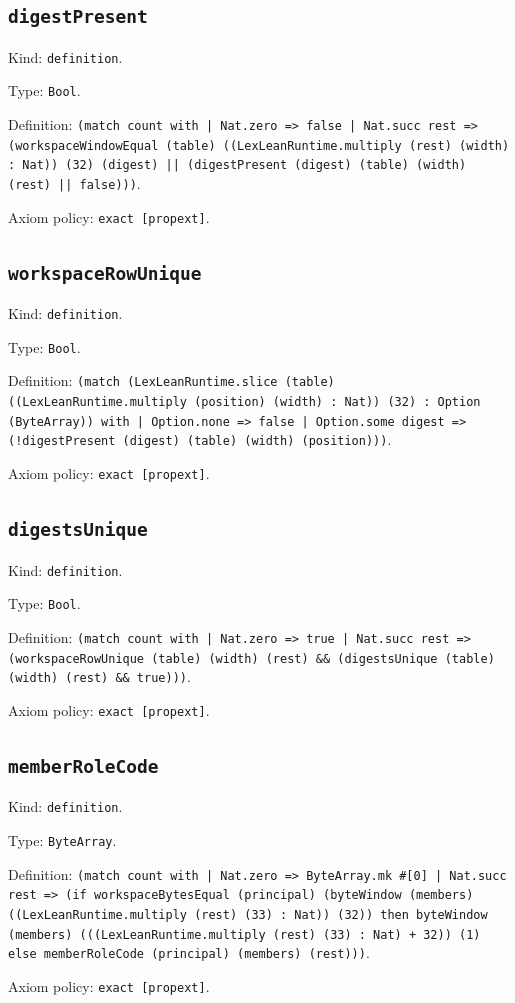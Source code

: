 \documentclass[11pt]{article}
\begin{document}
\subsection*{\texttt{digestPresent}}
\noindent Kind: \texttt{definition}.\par
\noindent Type: \texttt{Bool}.\par
\noindent Definition: \texttt{(match count with | Nat.zero => false | Nat.succ rest => (workspaceWindowEqual (table) ((LexLeanRuntime.multiply (rest) (width) : Nat)) (32) (digest) || (digestPresent (digest) (table) (width) (rest) || false)))}.\par
\noindent Axiom policy: \texttt{exact [propext]}.\par
\subsection*{\texttt{workspaceRowUnique}}
\noindent Kind: \texttt{definition}.\par
\noindent Type: \texttt{Bool}.\par
\noindent Definition: \texttt{(match (LexLeanRuntime.slice (table) ((LexLeanRuntime.multiply (position) (width) : Nat)) (32) : Option (ByteArray)) with | Option.none => false | Option.some digest => (!digestPresent (digest) (table) (width) (position)))}.\par
\noindent Axiom policy: \texttt{exact [propext]}.\par
\subsection*{\texttt{digestsUnique}}
\noindent Kind: \texttt{definition}.\par
\noindent Type: \texttt{Bool}.\par
\noindent Definition: \texttt{(match count with | Nat.zero => true | Nat.succ rest => (workspaceRowUnique (table) (width) (rest) \&\& (digestsUnique (table) (width) (rest) \&\& true)))}.\par
\noindent Axiom policy: \texttt{exact [propext]}.\par
\subsection*{\texttt{memberRoleCode}}
\noindent Kind: \texttt{definition}.\par
\noindent Type: \texttt{ByteArray}.\par
\noindent Definition: \texttt{(match count with | Nat.zero => ByteArray.mk \#[0] | Nat.succ rest => (if workspaceBytesEqual (principal) (byteWindow (members) ((LexLeanRuntime.multiply (rest) (33) : Nat)) (32)) then byteWindow (members) (((LexLeanRuntime.multiply (rest) (33) : Nat) + 32)) (1) else memberRoleCode (principal) (members) (rest)))}.\par
\noindent Axiom policy: \texttt{exact [propext]}.\par
\end{document}
